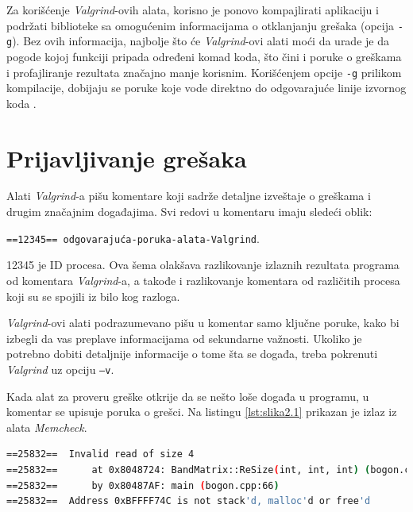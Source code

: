 \documentclass[12pt,oneside]{memoir}
\theoremstyle{plain}
\theoremstyle{definition}
\begin{document}
Za korišćenje \textit{Valgrind}-ovih alata, korisno je ponovo kompajlirati aplikaciju i podržati biblioteke sa omogućenim informacijama o otklanjanju grešaka (opcija \texttt{-g}). Bez ovih informacija, najbolje što će \textit{Valgrind}-ovi alati moći da urade je da pogode kojoj funkciji pripada određeni komad koda, što čini i poruke o greškama i profajliranje rezultata značajno manje korisnim. Korišćenjem opcije \texttt{-g} prilikom kompilacije, dobijaju se poruke koje vode direktno do odgovarajuće linije izvornog koda \cite{ValgrindCore}.

\section{Prijavljivanje grešaka}
Alati \textit{Valgrind}-a pišu komentare koji sadrže detaljne izveštaje o greškama i drugim značajnim događajima. Svi redovi u komentaru imaju sledeći oblik:
\begin{center}
\texttt{==12345== odgovarajuća-poruka-alata-Valgrind}.
\end{center}
12345 je ID procesa. Ova šema olakšava razlikovanje izlaznih rezultata programa od komentara \textit{Valgrind}-a, a takođe i razlikovanje komentara od različitih procesa koji su se spojili iz bilo kog razloga.

\textit{Valgrind}-ovi alati podrazumevano pišu u komentar samo ključne poruke, kako bi izbegli da vas preplave informacijama od sekundarne važnosti. Ukoliko je potrebno dobiti detaljnije informacije o tome šta se događa, treba pokrenuti \textit{Valgrind} uz opciju \texttt{–v}.

Kada alat za proveru greške otkrije da se nešto loše događa u programu, u komentar se upisuje poruka o grešci. Na listingu \ref{lst:slika2.1} prikazan je izlaz iz alata \textit{Memcheck}.

\begin{lstlisting}[style=terminal,caption={Primer izlaza alta \textit{Memcheck} \cite{ValgrindCore}}, label={lst:slika2.1},language={bash}]   
==25832==  Invalid read of size 4
==25832==      at 0x8048724: BandMatrix::ReSize(int, int, int) (bogon.cpp:45)
==25832==      by 0x80487AF: main (bogon.cpp:66)
==25832==  Address 0xBFFFF74C is not stack'd, malloc'd or free'd
\end{lstlisting}
\end{document}
